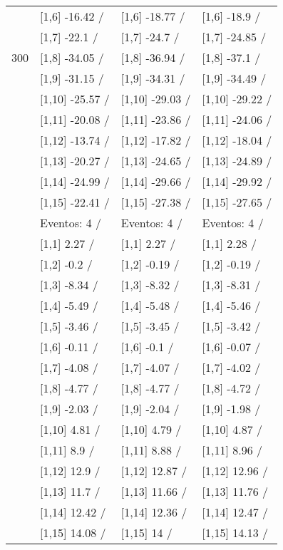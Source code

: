 \begin{table}
\begin{tabular}[t]{llll}
 & {}[1,6] -16.42  / & {}[1,6] -18.77  / & {}[1,6] -18.9  /\\
 & {}[1,7] -22.1  / & {}[1,7] -24.7  / & {}[1,7] -24.85  /\\
300 & {}[1,8] -34.05  / & {}[1,8] -36.94  / & {}[1,8] -37.1  /\\
\addlinespace
 & {}[1,9] -31.15  / & {}[1,9] -34.31  / & {}[1,9] -34.49  /\\
 & {}[1,10] -25.57  / & {}[1,10] -29.03  / & {}[1,10] -29.22  /\\
 & {}[1,11] -20.08  / & {}[1,11] -23.86  / & {}[1,11] -24.06  /\\
 & {}[1,12] -13.74  / & {}[1,12] -17.82  / & {}[1,12] -18.04  /\\
 & {}[1,13] -20.27  / & {}[1,13] -24.65  / & {}[1,13] -24.89  /\\
\addlinespace
 & {}[1,14] -24.99  / & {}[1,14] -29.66  / & {}[1,14] -29.92  /\\
 & {}[1,15] -22.41  / & {}[1,15] -27.38  / & {}[1,15] -27.65  /\\
 & Eventos:  4 / & Eventos:  4 / & Eventos:  4 /\\
 & {}[1,1] 2.27  / & {}[1,1] 2.27  / & {}[1,1] 2.28  /\\
 & {}[1,2] -0.2  / & {}[1,2] -0.19  / & {}[1,2] -0.19  /\\
\addlinespace
 & {}[1,3] -8.34  / & {}[1,3] -8.32  / & {}[1,3] -8.31  /\\
 & {}[1,4] -5.49  / & {}[1,4] -5.48  / & {}[1,4] -5.46  /\\
 & {}[1,5] -3.46  / & {}[1,5] -3.45  / & {}[1,5] -3.42  /\\
 & {}[1,6] -0.11  / & {}[1,6] -0.1  / & {}[1,6] -0.07  /\\
 & {}[1,7] -4.08  / & {}[1,7] -4.07  / & {}[1,7] -4.02  /\\
\addlinespace
500 & {}[1,8] -4.77  / & {}[1,8] -4.77  / & {}[1,8] -4.72  /\\
 & {}[1,9] -2.03  / & {}[1,9] -2.04  / & {}[1,9] -1.98  /\\
 & {}[1,10] 4.81  / & {}[1,10] 4.79  / & {}[1,10] 4.87  /\\
 & {}[1,11] 8.9  / & {}[1,11] 8.88  / & {}[1,11] 8.96  /\\
 & {}[1,12] 12.9  / & {}[1,12] 12.87  / & {}[1,12] 12.96  /\\
\addlinespace
 & {}[1,13] 11.7  / & {}[1,13] 11.66  / & {}[1,13] 11.76  /\\
 & {}[1,14] 12.42  / & {}[1,14] 12.36  / & {}[1,14] 12.47  /\\
 & {}[1,15] 14.08  / & {}[1,15] 14  / & {}[1,15] 14.13  /\\
\bottomrule
\end{tabular}
\end{table}
